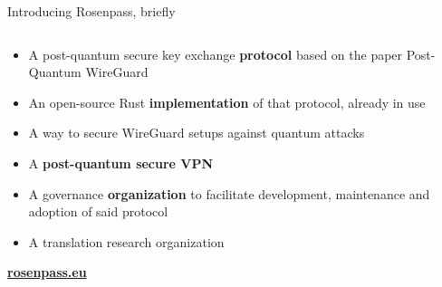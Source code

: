 \begin{frame}{Introducing Rosenpass, briefly}
\hypertarget{rosenpass-introduction}{}
  \begin{columns}[fullwidth,c]

    \begin{column}{.5\linewidth}
      \begin{itemize}
        \item A post-quantum secure key exchange \textbf{protocol}
          {\small based on the paper Post-Quantum WireGuard\citePqwg}
        \item An open-source Rust \textbf{implementation} of that protocol, already in use
        \item A way to secure WireGuard setups against quantum attacks
        \item A \textbf{post-quantum secure VPN}
        \item A governance \textbf{organization} to facilitate development, maintenance and adoption of said protocol
        \item A translation research organization
      \end{itemize}
      \vspace{2em}
      \textbf{\href{https://rosenpass.eu}{rosenpass.eu}}
    \end{column}%


  \end{columns}
\end{frame}

